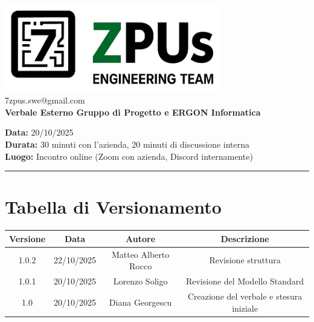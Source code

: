 \documentclass[a4paper,12pt]{article}
\begin{document}
\begin{center}
    \includegraphics[width=9.5cm]{../../../assets/logo7zpus.jpg}\\
    \small\hspace{10cm} 7zpus.swe@gmail.com\\
    \Large \textbf{Verbale Esterno Gruppo di Progetto e ERGON Informatica}\\
    \vspace{0.5cm}
\end{center}


\noindent
\textbf{Data:} 20/10/2025 \\
\textbf{Durata:}  30 minuti con l'azienda, 20 minuti di discussione interna \\
\textbf{Luogo:} Incontro online (Zoom con azienda, Discord internamente)

\vspace{0.3cm}
\hrule
\vspace{0.5cm}

\tableofcontents

\newpage

\section{Tabella di Versionamento}
\begin{center}
\begin{tabular}{|c|c|c|c|}
    \hline
    \textbf{Versione} & \textbf{Data} & \textbf{Autore} & \textbf{Descrizione} \\
    \hline
    1.0.2 & 22/10/2025 & Matteo Alberto Rocco & Revisione struttura \\
    \hline
    1.0.1 & 20/10/2025 & Lorenzo Soligo & Revisione del Modello Standard \\
    \hline
    1.0 & 20/10/2025 & Diana Georgescu & Creazione del verbale e stesura iniziale \\
    \hline
\end{tabular}
\end{center}
\end{document}
